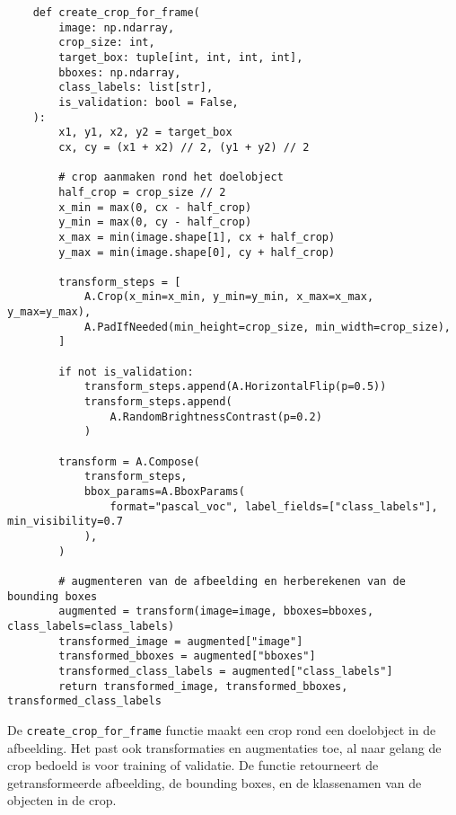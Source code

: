 \begin{listing}[H]
  \fontsize{11pt}{10pt}
  \begin{verbatim}
    def create_crop_for_frame(
        image: np.ndarray,
        crop_size: int,
        target_box: tuple[int, int, int, int],
        bboxes: np.ndarray,
        class_labels: list[str],
        is_validation: bool = False,  
    ):
        x1, y1, x2, y2 = target_box
        cx, cy = (x1 + x2) // 2, (y1 + y2) // 2

        # crop aanmaken rond het doelobject
        half_crop = crop_size // 2
        x_min = max(0, cx - half_crop)
        y_min = max(0, cy - half_crop)
        x_max = min(image.shape[1], cx + half_crop)
        y_max = min(image.shape[0], cy + half_crop)

        transform_steps = [
            A.Crop(x_min=x_min, y_min=y_min, x_max=x_max, y_max=y_max),
            A.PadIfNeeded(min_height=crop_size, min_width=crop_size),
        ]

        if not is_validation:
            transform_steps.append(A.HorizontalFlip(p=0.5))
            transform_steps.append(
                A.RandomBrightnessContrast(p=0.2)
            )

        transform = A.Compose(
            transform_steps,
            bbox_params=A.BboxParams(
                format="pascal_voc", label_fields=["class_labels"], min_visibility=0.7
            ),
        )

        # augmenteren van de afbeelding en herberekenen van de bounding boxes
        augmented = transform(image=image, bboxes=bboxes, class_labels=class_labels)
        transformed_image = augmented["image"]
        transformed_bboxes = augmented["bboxes"]
        transformed_class_labels = augmented["class_labels"]
        return transformed_image, transformed_bboxes, transformed_class_labels
  \end{verbatim}
  \caption[Functie voor het creëren van een crop rond een doelobject]{
    \label{listing:create-crop-frame}
    De \texttt{create\_crop\_for\_frame} functie maakt een crop rond een doelobject in de afbeelding.
    Het past ook transformaties en augmentaties toe, al naar gelang de crop bedoeld is voor training of validatie.
    De functie retourneert de getransformeerde afbeelding, de bounding boxes, en de klassenamen van de objecten in de crop.
    }
\end{listing}


